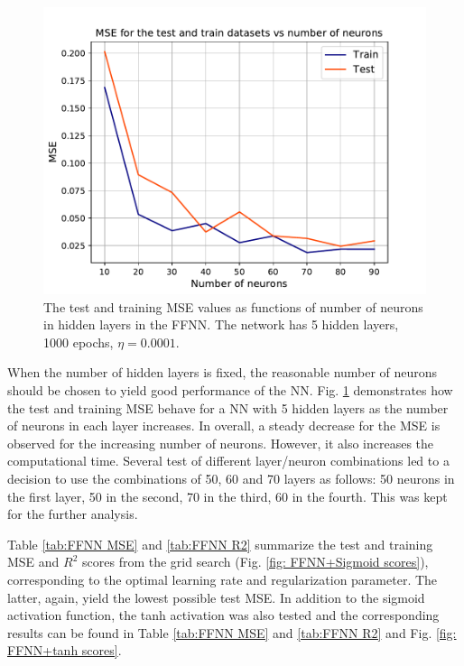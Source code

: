 \documentclass[numberedappendix, twocolappendix]{emulateapj}
\begin{document}
\begin{figure}[!htb]
    \centering
    \includegraphics[width=.49\textwidth]{Figures/NN_neurons.pdf}
    \caption{The test and training  MSE values as functions of number of neurons in hidden layers in the FFNN. The network has 5 hidden layers,  1000 epochs, $\eta=0.0001$. }
    \label{fig: neurons}
\end{figure}

When the number of hidden layers is fixed, the reasonable number of neurons should be chosen to yield good performance of the NN. Fig. \ref{fig: neurons} demonstrates how the test and training MSE behave for a NN with 5 hidden layers as the number of neurons in each layer increases. In overall, a steady decrease for the MSE is observed for the increasing number of neurons. However, it also increases the computational time. Several test of different layer/neuron combinations led to a decision to use the combinations of 50, 60 and 70 layers as follows: 50 neurons in the first layer, 50 in the second, 70 in the third, 60 in the fourth. This was kept for the further analysis. 


Table \ref{tab:FFNN MSE} and \ref{tab:FFNN R2} summarize the test and training MSE and $R^2$ scores from the grid search (Fig. \ref{fig: FFNN+Sigmoid scores}), corresponding to the optimal learning rate and regularization parameter. The latter, again, yield the lowest possible test MSE. In addition to the sigmoid activation function, the tanh activation was also tested and the corresponding results can be found in Table \ref{tab:FFNN MSE} and \ref{tab:FFNN R2} and Fig. \ref{fig: FFNN+tanh scores}.
\end{document}
